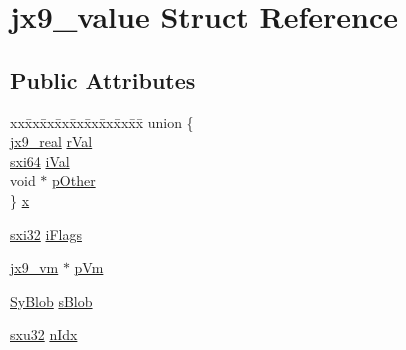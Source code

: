 \hypertarget{structjx9__value}{\section{jx9\-\_\-value Struct Reference}
\label{dc/d7b/structjx9__value}
}
\subsection*{Public Attributes}
\begin{DoxyCompactItemize}
\item 
\begin{tabbing}
xx\=xx\=xx\=xx\=xx\=xx\=xx\=xx\=xx\=\kill
union \{\\
\>\hyperlink{unqlite_8c_a09126bb29b11fc568b8f2612ffed6bfd}{jx9\_real} \hyperlink{structjx9__value_ab77cd0d0af1849fdca1fc9203558f9f6}{rVal}\\
\>\hyperlink{unqlite_8c_a7913a13763a99412223d5dfa1829dd73}{sxi64} \hyperlink{structjx9__value_ad9f0f5bcb14d09988738d7ee64fe1e19}{iVal}\\
\>void $\ast$ \hyperlink{structjx9__value_a101f0ff59b0e4de3da69b3b9b91e0598}{pOther}\\
\} \hyperlink{structjx9__value_ab7b1e3f6dbe52d6519c772c8e7263d63}{x}\\

\end{tabbing}\item 
\hyperlink{unqlite_8c_a5a58035d4ae379178e2ca46cc3272fc5}{sxi32} \hyperlink{structjx9__value_a3b4ce29d2307cb6338074a340d856d70}{i\-Flags}
\item 
\hyperlink{structjx9__vm}{jx9\-\_\-vm} $\ast$ \hyperlink{structjx9__value_a6e0e7ebebfc576fecc9b8131d0672a7e}{p\-Vm}
\item 
\hyperlink{struct_sy_blob}{Sy\-Blob} \hyperlink{structjx9__value_a02e50657e71231be7ccc35d23dd72276}{s\-Blob}
\item 
\hyperlink{unqlite_8c_abc5a8a3f345c200c98c485551f49666e}{sxu32} \hyperlink{structjx9__value_acc4573adda08561bbc81010e86140d09}{n\-Idx}
\end{DoxyCompactItemize}


